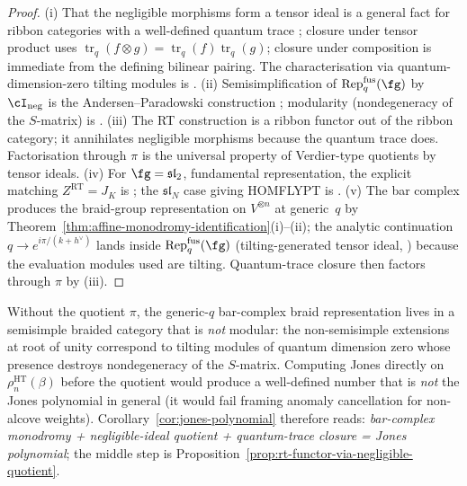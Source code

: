 \begin{proof}
(i) That the negligible morphisms form a tensor ideal is a general fact for ribbon categories with a well-defined quantum trace \cite[Prop.~4.4.1]{BaKi01}; closure under tensor product uses $\operatorname{tr}_q(f \otimes g) = \operatorname{tr}_q(f)\operatorname{tr}_q(g)$; closure under composition is immediate from the defining bilinear pairing. The characterisation via quantum-dimension-zero tilting modules is \cite[Thm.~4.1]{And92}.
(ii) Semisimplification of $\mathrm{Rep}_q^{\mathrm{fus}}(\fg)$ by $\cI_{\mathrm{neg}}$ is the Andersen--Paradowski construction \cite{AP95}; modularity (nondegeneracy of the $S$-matrix) is \cite[Thm.~3.3.20]{BaKi01}.
(iii) The RT construction is a ribbon functor out of the ribbon category; it annihilates negligible morphisms because the quantum trace does. Factorisation through $\pi$ is the universal property of Verdier-type quotients by tensor ideals.
(iv) For $\fg = \mathfrak{sl}_2$, fundamental representation, the explicit matching $Z^{\mathrm{RT}} = J_K$ is \cite{RT90}; the $\mathfrak{sl}_N$ case giving HOMFLYPT is \cite[\S3]{Tu94}.
(v) The bar complex produces the braid-group representation on $V^{\otimes n}$ at generic~$q$ by Theorem~\ref{thm:affine-monodromy-identification}(i)--(ii); the analytic continuation $q \to e^{i\pi/(k+h^\vee)}$ lands inside $\mathrm{Rep}_q^{\mathrm{fus}}(\fg)$ (tilting-generated tensor ideal, \cite[Thm.~2.5]{AP95}) because the evaluation modules used are tilting. Quantum-trace closure then factors through $\pi$ by (iii).
\end{proof}

\begin{remark}
\label{rem:negligible-not-optional}
Without the quotient $\pi$, the generic-$q$ bar-complex braid representation lives in a semisimple braided category that is \emph{not} modular: the non-semisimple extensions at root of unity correspond to tilting modules of quantum dimension zero whose presence destroys nondegeneracy of the $S$-matrix. Computing Jones directly on $\rho_n^{\mathrm{HT}}(\beta)$ before the quotient would produce a well-defined number that is \emph{not} the Jones polynomial in general (it would fail framing anomaly cancellation for non-alcove weights). Corollary~\ref{cor:jones-polynomial} therefore reads: \emph{bar-complex monodromy + negligible-ideal quotient + quantum-trace closure = Jones polynomial}; the middle step is Proposition~\ref{prop:rt-functor-via-negligible-quotient}.
\end{remark}

